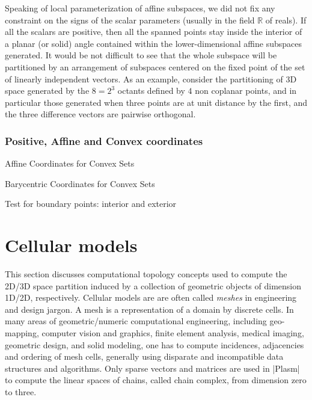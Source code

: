 Speaking of local parameterization of affine subspaces, we did not fix any constraint on the signs of the scalar parameters (usually in the field $\mathbb{R}$ of reals). If all the scalars are positive, then all the spanned points stay inside the interior of a planar (or solid) angle contained within the lower-dimensional affine subspaces generated. It would be not difficult to see that the whole subspace will be partitioned by an arrangement of subspaces centered on the fixed point of the set of linearly independent vectors. As an example, consider the partitioning of 3D space generated by the $8 = 2^3$ octants defined by $4$ non coplanar points, and in particular those generated when three points are at unit distance by the first, and the three difference vectors are pairwise orthogonal.

\subsubsection*{Positive, Affine and Convex coordinates}


Affine Coordinates for Convex Sets

Barycentric Coordinates for Convex Sets

Test for boundary points: interior and exterior









\section{Cellular models}\label{sect:3-2}


This section discusses computational topology concepts used to compute the 2D/3D space partition induced by a collection of geometric objects of dimension 1D/2D, respectively. Cellular models are are often called \emph{meshes} in engineering and design jargon. A mesh is a representation of a domain by discrete cells. In many areas of geometric/numeric computational engineering, including geo-mapping, computer vision and graphics, finite element analysis, medical imaging, geometric design, and solid modeling, one has to compute incidences, adjacencies and ordering of mesh cells, generally using disparate and incompatible data structures and algorithms. Only sparse vectors and matrices are used in |Plasm| to compute the linear spaces of chains, called chain complex, from dimension zero to three.

